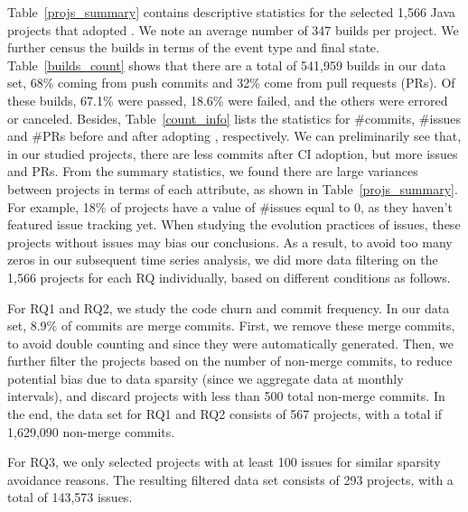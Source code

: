 Table~\ref{projs_summary} contains descriptive statistics for the selected 
1,566 Java projects that adopted \Tvis. 
We note an average number of 347 builds per project. 
We further census the builds in terms of the event type and final state. 
Table~\ref{builds_count} shows that there are a total of 541,959 builds in 
our data set, 68\% coming from push commits and 32\% come from pull 
requests (PRs). 
Of these builds, 67.1\% were passed, 18.6\% were failed, and the others 
were errored or canceled. 
Besides, Table~\ref{count_info} lists the statistics for \#commits, \#issues 
and \#PRs before and after adopting \Tvis, respectively. 
We can preliminarily see that, in our studied projects, there are less commits 
after CI adoption, but more issues and PRs. 
From the summary statistics, we found there are large variances between 
projects in terms of each attribute, as shown in Table~\ref{projs_summary}. 
For example, 18\% of projects have a value of \#issues equal to 0, as they 
haven't featured \GH issue tracking yet. 
When studying the evolution practices of issues, these projects without 
issues may bias our conclusions. 
As a result, to avoid too many zeros in our subsequent time series analysis, 
we did more data filtering on the 1,566 projects for each RQ individually, 
based on different conditions as follows.

For RQ1 and RQ2, we study the code churn and commit frequency. 
In our data set, 8.9\% of commits are merge commits. 
First, we remove these merge commits, to avoid double counting and since 
they were automatically generated. 
Then, we further filter the projects based on the number of non-merge commits,
to reduce potential bias due to data sparsity (since we aggregate data at 
monthly intervals), and discard projects with less than 500 total non-merge 
commits.
In the end, the data set for RQ1 and RQ2 consists of 567 projects, with a 
total if 1,629,090 non-merge commits.

For RQ3, we only selected projects with at least 100 issues for similar sparsity 
avoidance reasons. 
The resulting filtered data set consists of 293 projects, with a total of 143,573 
\GH issues.

